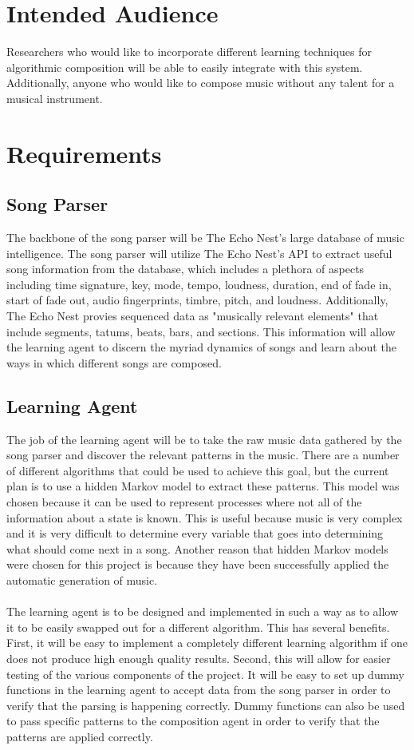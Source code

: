 \documentclass{article}
\begin{document}
\section{Intended Audience}
Researchers who would like to incorporate different learning techniques for algorithmic composition will be able to easily integrate with this system. Additionally, anyone who would like to compose music without any talent for a musical instrument.

\section{Requirements}
\subsection{Song Parser}
The backbone of the song parser will be The Echo Nest's large database of music intelligence. The song parser will utilize The Echo Nest's API to extract useful song information from the database, which includes a plethora of aspects including time signature, key, mode, tempo, loudness, duration, end of fade in, start of fade out, audio fingerprints, timbre, pitch, and loudness. Additionally, The Echo Nest provies sequenced data as "musically relevant elements" that include segments, tatums, beats, bars, and sections. This information will allow the learning agent to discern the myriad dynamics of songs and learn about the ways in which different songs are composed.

\subsection{Learning Agent}
The job of the learning agent will be to take the raw music data gathered by the song parser and discover the relevant patterns in the music. There are a number of different algorithms that could be used to achieve this goal, but the current plan is to use a hidden Markov model to extract these patterns. This model was chosen because it can be used to represent processes where not all of the information about a state is known. This is useful because music is very complex and it is very difficult to determine every variable that goes into determining what should come next in a song. Another reason that hidden Markov models were chosen for this project is because they have been successfully applied the automatic generation of music.\\
\\
The learning agent is to be designed and implemented in such a way as to allow it to be easily swapped out for a different algorithm. This has several benefits. First, it will be easy to implement a completely different learning algorithm if one does not produce high enough quality results. Second, this will allow for easier testing of the various components of the project. It will be easy to set up dummy functions in the learning agent to accept data from the song parser in order to verify that the parsing is happening correctly. Dummy functions can also be used to pass specific patterns to the composition agent in order to verify that the patterns are applied correctly.
\end{document}
